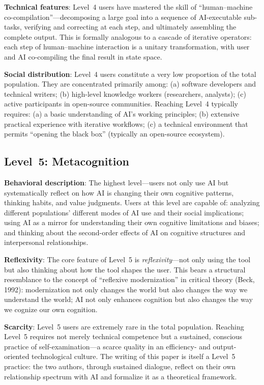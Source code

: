 ﻿\documentclass[12pt,a4paper]{article}
\begin{document}
\textbf{Technical features}: Level~4 users have mastered the skill of ``human--machine co-compilation''---decomposing a large goal into a sequence of AI-executable sub-tasks, verifying and correcting at each step, and ultimately assembling the complete output. This is formally analogous to a cascade of iterative operators: each step of human--machine interaction is a unitary transformation, with user and AI co-compiling the final result in state space.

\textbf{Social distribution}: Level~4 users constitute a very low proportion of the total population. They are concentrated primarily among: (a) software developers and technical writers; (b) high-level knowledge workers (researchers, analysts); (c) active participants in open-source communities. Reaching Level~4 typically requires: (a) a basic understanding of AI's working principles; (b) extensive practical experience with iterative workflows; (c) a technical environment that permits ``opening the black box'' (typically an open-source ecosystem).

\subsection{Level~5: Metacognition}

\textbf{Behavioral description}: The highest level---users not only use AI but systematically reflect on how AI is changing their own cognitive patterns, thinking habits, and value judgments. Users at this level are capable of: analyzing different populations' different modes of AI use and their social implications; using AI as a mirror for understanding their own cognitive limitations and biases; and thinking about the second-order effects of AI on cognitive structures and interpersonal relationships.

\textbf{Reflexivity}: The core feature of Level~5 is \textit{reflexivity}---not only using the tool but also thinking about how the tool shapes the user. This bears a structural resemblance to the concept of ``reflexive modernization'' in critical theory (Beck, 1992): modernization not only changes the world but also changes the way we understand the world; AI not only enhances cognition but also changes the way we cognize our own cognition.

\textbf{Scarcity}: Level~5 users are extremely rare in the total population. Reaching Level~5 requires not merely technical competence but a sustained, conscious practice of self-examination---a scarce quality in an efficiency- and output-oriented technological culture. The writing of this paper is itself a Level~5 practice: the two authors, through sustained dialogue, reflect on their own relationship spectrum with AI and formalize it as a theoretical framework.
\end{document}
